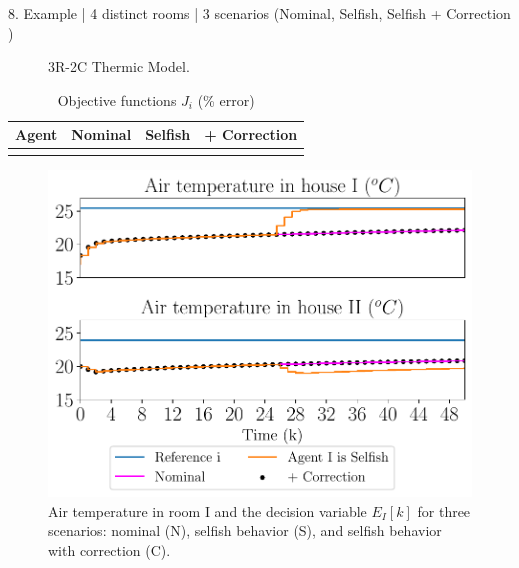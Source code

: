 \documentclass[presentation]{beamer}
\begin{document}
\begin{frame}
\begin{textblock}{15.6}
\begin{block}{8. Example | 4 distinct rooms | 3 scenarios (Nominal, Selfish, Selfish + Correction ) }
\begin{minipage}[c]{27cm}
\begin{figure}[h]
\begin{tikzpicture}[european]
          \end{tikzpicture}
          \caption{3R-2C Thermic Model.}
        \end{figure}
        \begin{table}[h]
          \caption{Objective functions $J_{i}$ (\% error)}\label{tab:costsGlobalLocal}
          \begin{tabular}[t]{cccc}
            \toprule
            Agent  & Nominal & Selfish & + Correction\\
            \midrule
            \\
            \bottomrule
          \end{tabular}
        \end{table}
      \end{minipage}
      \hfill
      \begin{minipage}[c]{26cm}
        \begin{figure}[h]
          \includegraphics[width=\textwidth]{../img/airtemp_roomI/__ErrorWX_command_normErrH_poster.pdf}
          \caption{\centering Air temperature in room I and the decision variable $E_{I}[k]$ for three scenarios: nominal (N), selfish behavior (S),
            and selfish behavior with correction (C).}\label{fig:response3Scenarios}
        \end{figure}
      \end{minipage}
      \hfill
      \begin{minipage}[c]{26cm}
        \begin{figure}[h]

\end{figure}
\end{minipage}
\end{block}
\end{textblock}
\end{frame}
\end{document}
